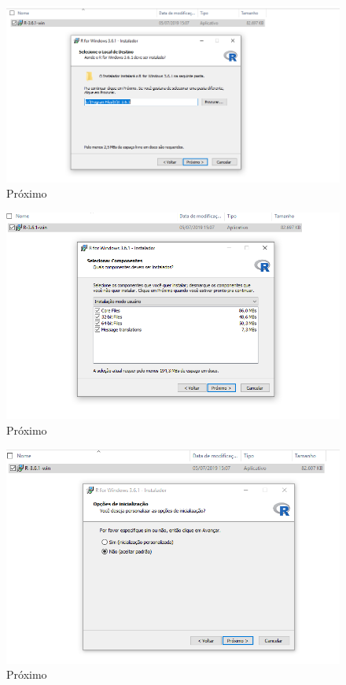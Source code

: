 \documentclass[
]{book}
\begin{document}
\begin{figure}
\includegraphics[width=1\linewidth]{figures/install_Windows5} \caption{\label{fig:windows5}Próximo }\label{fig:windows5}
\end{figure}

\begin{figure}
\includegraphics[width=1\linewidth]{figures/install_Windows6} \caption{\label{fig:windows6}Próximo }\label{fig:windows6}
\end{figure}

\begin{figure}
\includegraphics[width=1\linewidth]{figures/install_Windows7} \caption{\label{fig:windows7}Próximo }\label{fig:windows7}
\end{figure}
\end{document}
